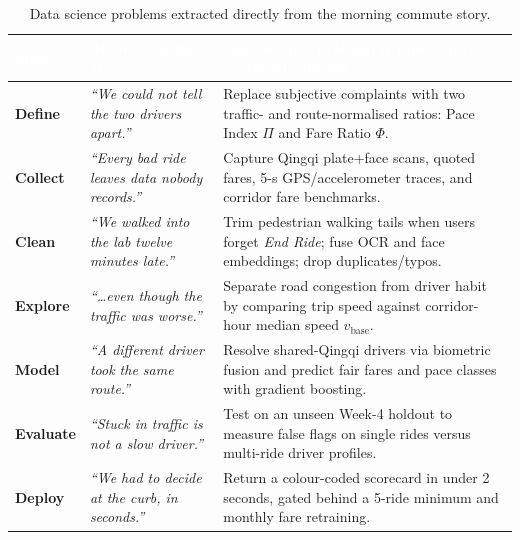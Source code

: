 \documentclass[12pt, a4paper]{article}
\newcommand{\hdr}[1]{\textcolor{white}{\textbf{#1}}}
\begin{document}
\begin{table}[H]
\centering\scriptsize
\caption{Data science problems extracted directly from the morning commute story.}
\label{tab:extract}
{\renewcommand{\arraystretch}{1.08}
\begin{tabularx}{\textwidth}{|>{\columncolor{softblue}\bfseries\color{navyblue}}p{1.35cm}|>{\itshape}p{4.2cm}|X|}
\hline
\rowcolor{navyblue}\hdr{Stage} & \hdr{Moment in the story} & \hdr{Data science problem it raises and proposed solution} \\ \hline
Define   & ``We could not tell the two drivers apart.'' & Replace subjective complaints with two traffic- and route-normalised ratios: Pace Index \(\Pi\) and Fare Ratio \(\Phi\). \\ \hline
Collect  & ``Every bad ride leaves data nobody records.'' & Capture Qingqi plate+face scans, quoted fares, 5-s GPS/accelerometer traces, and corridor fare benchmarks. \\ \hline
Clean    & ``We walked into the lab twelve minutes late.'' & Trim pedestrian walking tails when users forget \emph{End Ride}; fuse OCR and face embeddings; drop duplicates/typos. \\ \hline
Explore  & ``\ldots even though the traffic was worse.'' & Separate road congestion from driver habit by comparing trip speed against corridor-hour median speed \(v_{\mathrm{base}}\). \\ \hline
Model    & ``A different driver took the same route.'' & Resolve shared-Qingqi drivers via biometric fusion and predict fair fares and pace classes with gradient boosting. \\ \hline
Evaluate & ``Stuck in traffic is not a slow driver.'' & Test on an unseen Week-4 holdout to measure false flags on single rides versus multi-ride driver profiles. \\ \hline
Deploy   & ``We had to decide at the curb, in seconds.'' & Return a colour-coded scorecard in under 2 seconds, gated behind a 5-ride minimum and monthly fare retraining. \\ \hline
\end{tabularx}}
\end{table}
\end{document}
